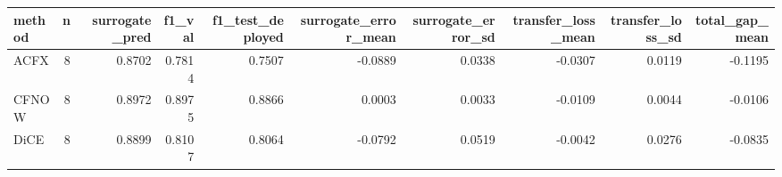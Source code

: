 \begin{tabular}{lrrrrrrrrr}
\toprule
method &  n &  surrogate\_pred &  f1\_val &  f1\_test\_deployed &  surrogate\_error\_mean &  surrogate\_error\_sd &  transfer\_loss\_mean &  transfer\_loss\_sd &  total\_gap\_mean \\
\midrule
  ACFX &  8 &          0.8702 &  0.7814 &            0.7507 &               -0.0889 &              0.0338 &             -0.0307 &            0.0119 &         -0.1195 \\
 CFNOW &  8 &          0.8972 &  0.8975 &            0.8866 &                0.0003 &              0.0033 &             -0.0109 &            0.0044 &         -0.0106 \\
  DiCE &  8 &          0.8899 &  0.8107 &            0.8064 &               -0.0792 &              0.0519 &             -0.0042 &            0.0276 &         -0.0835 \\
\bottomrule
\end{tabular}
